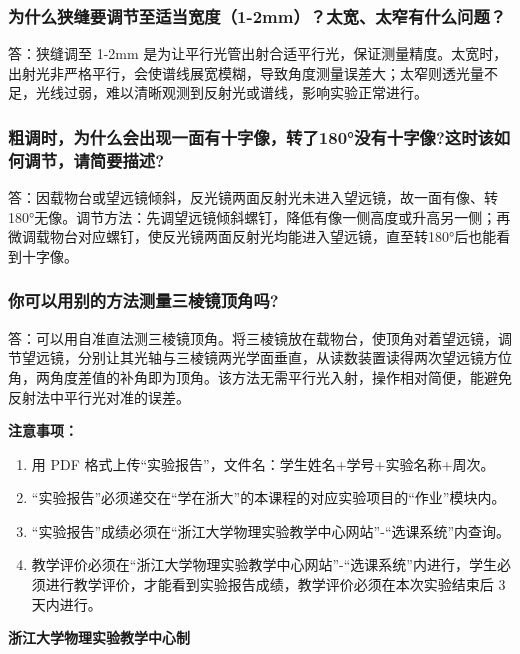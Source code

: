 \documentclass[10pt,a4paper]{ctexart}
\newcommand{\sihao}{\fontsize{14pt}{18pt}\selectfont}
\newcommand{\xiaosi}{\fontsize{12pt}{16pt}\selectfont}
\begin{document}
    \subsubsection*{为什么狭缝要调节至适当宽度（1-2mm）？太宽、太窄有什么问题？}
    
    答：狭缝调至 1-2mm 是为让平行光管出射合适平行光，保证测量精度。太宽时，出射光非严格平行，会使谱线展宽模糊，导致角度测量误差大；太窄则透光量不足，光线过弱，难以清晰观测到反射光或谱线，影响实验正常进行。
        
    \subsubsection*{粗调时，为什么会出现一面有十字像，转了180°没有十字像?这时该如何调节，请简要描述?}
    
    答：因载物台或望远镜倾斜，反光镜两面反射光未进入望远镜，故一面有像、转180°无像。调节方法：先调望远镜倾斜螺钉，降低有像一侧高度或升高另一侧；再微调载物台对应螺钉，使反光镜两面反射光均能进入望远镜，直至转180°后也能看到十字像。
       
    \subsubsection*{你可以用别的方法测量三棱镜顶角吗?}

    答：可以用自准直法测三棱镜顶角。将三棱镜放在载物台，使顶角对着望远镜，调节望远镜，分别让其光轴与三棱镜两光学面垂直，从读数装置读得两次望远镜方位角，两角度差值的补角即为顶角。该方法无需平行光入射，操作相对简便，能避免反射法中平行光对准的误差。
    
    

\newpage

\sihao\textbf{注意事项：}
\xiaosi
\begin{enumerate}
    \item  用 PDF 格式上传“实验报告”，文件名：学生姓名+学号+实验名称+周次。
    \item  “实验报告”必须递交在“学在浙大”的本课程的对应实验项目的“作业”模块内。
    \item  “实验报告”成绩必须在“浙江大学物理实验教学中心网站”-“选课系统”内查询。
    \item 教学评价必须在“浙江大学物理实验教学中心网站”-“选课系统”内进行，学生必须进行教学评价，才能看到实验报告成绩，教学评价必须在本次实验结束后 3 天内进行。
\end{enumerate}

\vspace{1cm}
\xiaosi\centering \textbf{浙江大学物理实验教学中心制}
\end{document}
